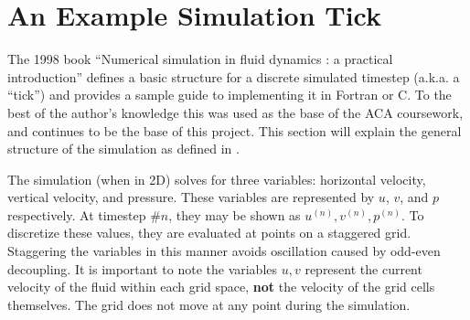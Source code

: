 \newcommand{\deltaT}[0]{$\delta{}t$}
\newcommand{\deltaX}[0]{$\delta{}x$}
\newcommand{\deltaY}[0]{$\delta{}y$}

\section{An Example Simulation Tick}
The 1998 book ``Numerical simulation in fluid dynamics : a practical introduction''\cite{book:griebel1998numerical} defines a basic structure for a discrete simulated timestep (a.k.a. a ``tick'') and provides a sample guide to implementing it in Fortran or C.
To the best of the author's knowledge this was used as the base of the ACA coursework, and continues to be the base of this project.
This section will explain the general structure of the simulation as defined in \cite{book:griebel1998numerical}.


The simulation (when in 2D) solves for three variables: horizontal velocity, vertical velocity, and pressure.
These variables are represented by $u$, $v$, and $p$ respectively.
At timestep $\#n$, they may be shown as $u^{(n)}, v^{(n)}, p^{(n)}$.
To discretize these values, they are evaluated at points on a staggered grid.
Staggering the variables in this manner avoids oscillation caused by odd-even decoupling.
\todocite{}
It is important to note the variables $u,v$ represent the current velocity of the fluid within each grid space, \textbf{not} the velocity of the grid cells themselves.
The grid does not move at any point during the simulation.

